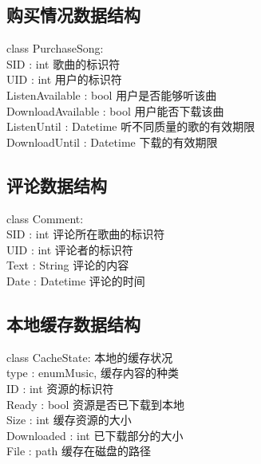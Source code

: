 \subsection{购买情况数据结构}

class PurchaseSong:\\
\indent \indent    SID : int           歌曲的标识符\\
\indent \indent    UID : int           用户的标识符\\
\indent \indent    ListenAvailable : bool    用户是否能够听该曲\\
\indent \indent    DownloadAvailable : bool  用户能否下载该曲\\
\indent \indent    ListenUntil : Datetime    听不同质量的歌的有效期限\\
\indent \indent    DownloadUntil : Datetime  下载的有效期限

\subsection{评论数据结构}

class Comment:\\
\indent \indent    SID : int           评论所在歌曲的标识符\\
\indent \indent    UID : int           评论者的标识符\\
\indent \indent    Text : String       评论的内容\\
\indent \indent    Date : Datetime     评论的时间

\subsection{本地缓存数据结构}

class CacheState:       本地的缓存状况\\
\indent \indent    type : enum{Music, }
\indent \indent                        缓存内容的种类\\
\indent \indent    ID : int            资源的标识符\\
\indent \indent    Ready : bool        资源是否已下载到本地\\
\indent \indent    Size : int          缓存资源的大小\\
\indent \indent    Downloaded : int    已下载部分的大小\\
\indent \indent    File : path         缓存在磁盘的路径\\

